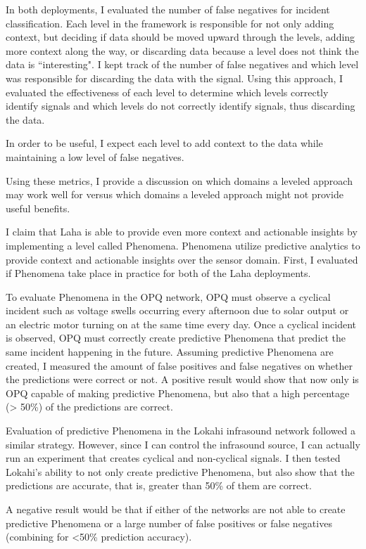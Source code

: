 In both deployments, I evaluated the number of false negatives for incident classification. Each level in the framework is responsible for not only adding context, but deciding if data should be moved upward through the levels, adding more context along the way, or discarding data because a level does not think the data is ``interesting". I kept track of the number of false negatives and which level was responsible for discarding the data with the signal. Using this approach, I evaluated the effectiveness of each level to determine which levels correctly identify signals and which levels do not correctly identify signals, thus discarding the data.

In order to be useful, I expect each level to add context to the data while maintaining a low level of false negatives.

Using these metrics, I provide a discussion on which domains a leveled approach may work well for versus which domains a leveled approach might not provide useful benefits.

I claim that Laha is able to provide even more context and actionable insights by implementing a level called Phenomena. Phenomena utilize predictive analytics to provide context and actionable insights over the sensor domain. First, I evaluated if Phenomena take place in practice for both of the Laha deployments.

To evaluate Phenomena in the OPQ network, OPQ must observe a cyclical incident such as voltage swells occurring every afternoon due to solar output or an electric motor turning on at the same time every day. Once a cyclical incident is observed, OPQ must correctly create predictive Phenomena that predict the same incident happening in the future. Assuming predictive Phenomena are created, I measured the amount of false positives and false negatives on whether the predictions were correct or not. A positive result would show that now only is OPQ capable of making predictive Phenomena, but also that a high percentage (> 50\%) of the predictions are correct.

Evaluation of predictive Phenomena in the Lokahi infrasound network followed a similar strategy. However, since I can control the infrasound source, I can actually run an experiment that creates cyclical and non-cyclical signals. I then tested Lokahi's ability to not only create predictive Phenomena, but also show that the predictions are accurate, that is, greater than 50\% of them are correct.

A negative result would be that if either of the networks are not able to create predictive Phenomena or a large number of false positives or false negatives (combining for <50\% prediction accuracy).


